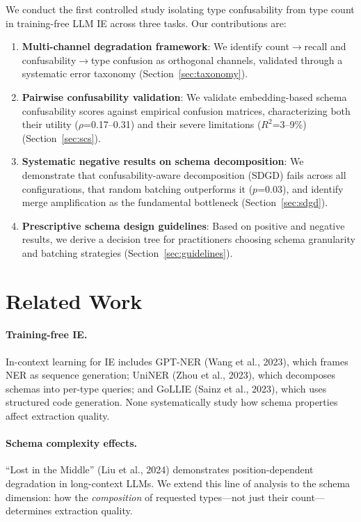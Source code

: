 \documentclass[11pt,a4paper]{article}
\begin{document}
We conduct the first controlled study isolating type confusability from type count in training-free LLM IE across three tasks. Our contributions are:

\begin{enumerate}
\item \textbf{Multi-channel degradation framework}: We identify count$\rightarrow$recall and confusability$\rightarrow$type confusion as orthogonal channels, validated through a systematic error taxonomy (Section~\ref{sec:taxonomy}).

\item \textbf{Pairwise confusability validation}: We validate embedding-based schema confusability scores against empirical confusion matrices, characterizing both their utility ($\rho$=0.17--0.31) and their severe limitations ($R^2$=3--9\%) (Section~\ref{sec:scs}).

\item \textbf{Systematic negative results on schema decomposition}: We demonstrate that confusability-aware decomposition (SDGD) fails across all configurations, that random batching outperforms it ($p$=0.03), and identify merge amplification as the fundamental bottleneck (Section~\ref{sec:sdgd}).

\item \textbf{Prescriptive schema design guidelines}: Based on positive and negative results, we derive a decision tree for practitioners choosing schema granularity and batching strategies (Section~\ref{sec:guidelines}).
\end{enumerate}

\section{Related Work}

\paragraph{Training-free IE.} In-context learning for IE includes GPT-NER (Wang et al., 2023), which frames NER as sequence generation; UniNER (Zhou et al., 2023), which decomposes schemas into per-type queries; and GoLLIE (Sainz et al., 2023), which uses structured code generation. None systematically study how schema properties affect extraction quality.

\paragraph{Schema complexity effects.} ``Lost in the Middle'' (Liu et al., 2024) demonstrates position-dependent degradation in long-context LLMs. We extend this line of analysis to the schema dimension: how the \emph{composition} of requested types---not just their count---determines extraction quality.
\end{document}
